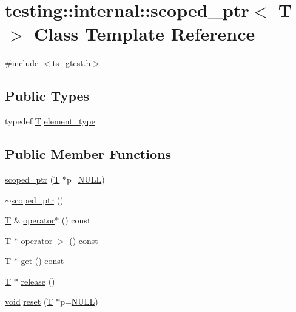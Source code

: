 \hypertarget{classtesting_1_1internal_1_1scoped__ptr}{\section{testing\-:\-:internal\-:\-:scoped\-\_\-ptr$<$ T $>$ Class Template Reference}
\label{classtesting_1_1internal_1_1scoped__ptr}
}


{\ttfamily \#include $<$ts\-\_\-gtest.\-h$>$}

\subsection*{Public Types}
\begin{DoxyCompactItemize}
\item 
typedef \hyperlink{calib3d_8hpp_a3efb9551a871ddd0463079a808916717}{T} \hyperlink{classtesting_1_1internal_1_1scoped__ptr_ae755ffeebada8e20b68c1d1ffa91cf13}{element\-\_\-type}
\end{DoxyCompactItemize}
\subsection*{Public Member Functions}
\begin{DoxyCompactItemize}
\item 
\hyperlink{classtesting_1_1internal_1_1scoped__ptr_adb972432999a0c63720df148964ac2a5}{scoped\-\_\-ptr} (\hyperlink{calib3d_8hpp_a3efb9551a871ddd0463079a808916717}{T} $\ast$p=\hyperlink{Config_8cpp_a070d2ce7b6bb7e5c05602aa8c308d0c4}{N\-U\-L\-L})
\item 
\hyperlink{classtesting_1_1internal_1_1scoped__ptr_ab721de9bf4369f002fb563e82352ee36}{$\sim$scoped\-\_\-ptr} ()
\item 
\hyperlink{calib3d_8hpp_a3efb9551a871ddd0463079a808916717}{T} \& \hyperlink{classtesting_1_1internal_1_1scoped__ptr_ab197837f87062de69d9d6e04539bbabe}{operator$\ast$} () const 
\item 
\hyperlink{calib3d_8hpp_a3efb9551a871ddd0463079a808916717}{T} $\ast$ \hyperlink{classtesting_1_1internal_1_1scoped__ptr_adc38310fbbe400faf9279e36000a17c4}{operator-\/$>$} () const 
\item 
\hyperlink{calib3d_8hpp_a3efb9551a871ddd0463079a808916717}{T} $\ast$ \hyperlink{classtesting_1_1internal_1_1scoped__ptr_adc8f8fcb63ce69f80f011456e6d2f08d}{get} () const 
\item 
\hyperlink{calib3d_8hpp_a3efb9551a871ddd0463079a808916717}{T} $\ast$ \hyperlink{classtesting_1_1internal_1_1scoped__ptr_a7a4f3e568d81a5d8bcb5f8d6bf5130b1}{release} ()
\item 
\hyperlink{legacy_8hpp_a8bb47f092d473522721002c86c13b94e}{void} \hyperlink{classtesting_1_1internal_1_1scoped__ptr_acac03266a43359801aff0de5c990bec0}{reset} (\hyperlink{calib3d_8hpp_a3efb9551a871ddd0463079a808916717}{T} $\ast$p=\hyperlink{Config_8cpp_a070d2ce7b6bb7e5c05602aa8c308d0c4}{N\-U\-L\-L})
\end{DoxyCompactItemize}



